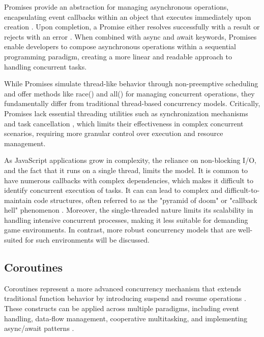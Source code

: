 \documentclass[]{final}
\begin{document}
Promises provide an abstraction for managing asynchronous operations,
encapsulating event callbacks within an object that executes
immediately upon creation \cite{zhao_concurrency_2021}.
Upon completion, a Promise either
resolves successfully with a result or rejects with an error
\cite{zhao_concurrency_2021}. When combined with async and await
keywords, Promises enable
developers to compose asynchronous operations within a
sequential programming paradigm, creating a more linear and
readable approach to handling concurrent tasks.

While Promises simulate thread-like behavior through non-preemptive scheduling
and offer methods like race() and all() for managing concurrent operations,
\cite{noauthor_event_2024} they fundamentally differ from traditional thread-based
concurrency models.
Critically, Promises lack essential threading utilities such as synchronization
mechanisms and task cancellation \cite{zhao_concurrency_2021}, which limits their effectiveness in
complex concurrent scenarios, requiring more granular control over execution
and resource management.

As JavaScript applications grow in complexity, the reliance on non-blocking
I/O, and the fact that it runs on a single thread,
limits the model. It
is common to have numerous callbacks with complex dependencies,
which makes it difficult to identify concurrent
execution of tasks.
It can can lead to complex and difficult-to-maintain code structures, often
referred to as the "pyramid of doom" or "callback hell" phenomenon \cite{belson_survey_2019, noauthor_callback_nodate}.
Moreover, the single-threaded nature limits its scalability in handling
intensive concurrent processes, making it less suitable for demanding game environments.
In contrast, more robust concurrency models that are well-suited for
such environments will be discussed.

\subsection{Coroutines}

Coroutines represent a more advanced concurrency mechanism that extends
traditional function behavior by introducing suspend and resume operations \cite{belson_survey_2019}.
These  constructs can be applied across multiple paradigms, including event
handling, data-flow management, cooperative multitasking, and
implementing async/await patterns \cite{belson_survey_2019}.
\end{document}
